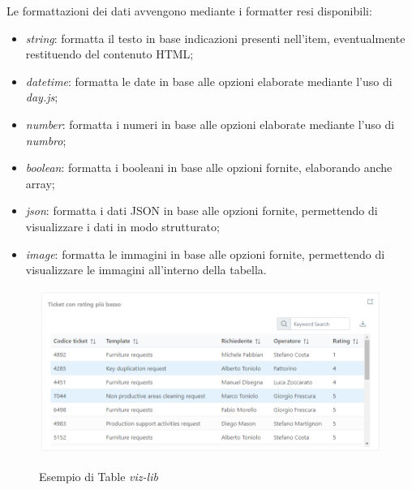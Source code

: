 Le formattazioni dei dati avvengono mediante i formatter resi disponibili:
\begin{itemize}
    \item \textit{string}: formatta il testo in base indicazioni presenti nell'item, eventualmente restituendo del contenuto HTML;
    \item \textit{datetime}: formatta le date in base alle opzioni elaborate mediante l'uso di \textit{day.js};
    \item \textit{number}: formatta i numeri in base alle opzioni elaborate mediante l'uso di \textit{numbro};
    \item \textit{boolean}: formatta i booleani in base alle opzioni fornite, elaborando anche array;
    \item \textit{json}: formatta i dati JSON in base alle opzioni fornite, permettendo di visualizzare i dati in modo strutturato;
    \item \textit{image}: formatta le immagini in base alle opzioni fornite, permettendo di visualizzare le immagini all'interno della tabella.
\end{itemize}

\begin{figure}[H]
    \centering
    \includegraphics[alt={Esempio di Table viz-lib}, width=1 \columnwidth, height=\maxdimen, keepaspectratio]{img/ex_table.png}
    \caption{Esempio di Table \textit{viz-lib}}
    \label{fig:table-example}
\end{figure}

